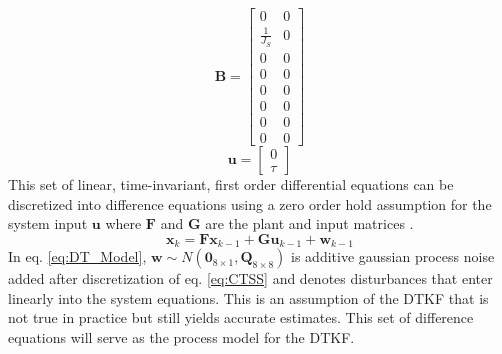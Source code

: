 \begin{equation}
    \mathbf{B} = \begin{bmatrix} 0 & 0 \\
     \frac{1}{J_S} & 0 \\
     0 & 0 \\
     0 & 0 \\
     0 & 0 \\
     0 & 0 \\
     0 & 0 \\
     0 & 0 \end{bmatrix}
\end{equation}
\begin{equation}
    \mathbf{u} = \begin{bmatrix} 0 \\ \tau  \end{bmatrix}
\end{equation}
This set of linear, time-invariant, first order differential equations can be discretized into difference equations using a zero order hold assumption for the system input $\mathbf{u}$ where $\mathbf{F}$ and $\mathbf{G}$ are the plant and input matrices \cite{juang2001identification,stengel2012optimal,simon2006optimal}. 
\begin{equation}\label{eq:DT_Model}
    \mathbf{x}_{k} = \mathbf{F}\mathbf{x}_{k-1} + \mathbf{G}\mathbf{u}_{k-1} + \mathbf{w}_{k-1}
\end{equation}
In eq. \ref{eq:DT_Model}, $\mathbf{w} \sim N(\mathbf{0}_{8\times1},\mathbf{Q}_{8\times8})$ is additive gaussian process noise added after discretization of eq. \ref{eq:CTSS} and denotes disturbances that enter linearly into the system equations. This is an assumption of the DTKF that is not true in practice but still yields accurate estimates. This set of difference equations will serve as the process model for the DTKF.

